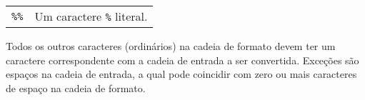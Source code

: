 \documentclass[11pt, brazil]{report}
\begin{document}
\begin{tabular}{@{}p{20pt}p{421.5pt}@{}}
{\tt\%\%}&Um caractere {\tt\%} literal.\\
\end{tabular}

Todos os outros caracteres (ordinários) na cadeia de formato devem ter um
caractere \linebreak correspondente com a cadeia de entrada a ser convertida. Exceções
são espaços na cadeia de entrada, a qual pode coincidir com zero ou mais
caracteres de espaço na cadeia de formato.

%
%
%
%
%
%
%
%
%
%
\end{document}
